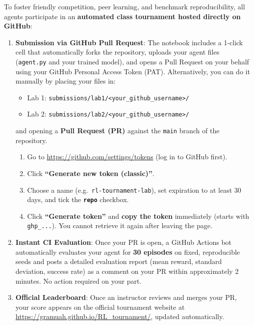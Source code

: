 \documentclass[11pt,a4paper]{article}
\begin{document}
To foster friendly competition, peer learning, and benchmark reproducibility, all agents participate in an \textbf{automated class tournament hosted directly on GitHub}:

\begin{enumerate}
    \item \textbf{Submission via GitHub Pull Request}: The notebook includes a 1-click cell that automatically forks the repository, uploads your agent files (\texttt{agent.py} and your trained model), and opens a Pull Request on your behalf using your GitHub Personal Access Token (PAT). Alternatively, you can do it manually by placing your files in:
    \begin{itemize}
        \item Lab 1: \texttt{submissions/lab1/<your\_github\_username>/}
        \item Lab 2: \texttt{submissions/lab2/<your\_github\_username>/}
    \end{itemize}
    and opening a \textbf{Pull Request (PR)} against the \texttt{main} branch of the repository.

    \begin{infobox}
    \begin{enumerate}
        \item Go to \url{https://github.com/settings/tokens} (log in to GitHub first).
        \item Click \textbf{``Generate new token (classic)''}.
        \item Choose a name (e.g.\ \texttt{rl-tournament-lab}), set expiration to at least 30 days, and tick the \textbf{\texttt{repo}} checkbox.
        \item Click \textbf{``Generate token''} and \textbf{copy the token} immediately (starts with \texttt{ghp\_...}). You cannot retrieve it again after leaving the page.
    \end{enumerate}
    \end{infobox}

    \item \textbf{Instant CI Evaluation}: Once your PR is open, a GitHub Actions bot automatically evaluates your agent for \textbf{30 episodes} on fixed, reproducible seeds and posts a detailed evaluation report (mean reward, standard deviation, success rate) as a comment on your PR within approximately 2 minutes. No action required on your part.
    \item \textbf{Official Leaderboard}: Once an instructor reviews and merges your PR, your score appears on the official tournament website at \url{https://gramuah.github.io/RL_tournament/}, updated automatically.
\end{enumerate}
\end{document}
